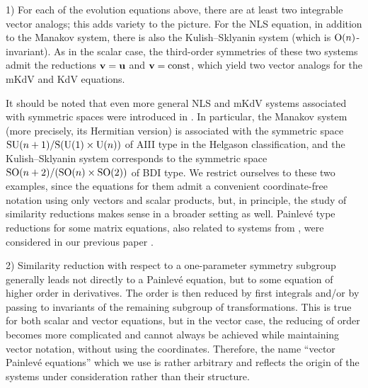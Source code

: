 \documentclass[11pt]{article}
\theoremstyle{plain}
\theoremstyle{definition}
\begin{document}
1) For each of the evolution equations above, there are at least two integrable vector analogs; this adds variety to the picture. For the NLS equation, in addition to the Manakov system, there is also the Kulish--Sklyanin system \cite{Kulish_Sklyanin_1981} (which is ${\rm O}(n)$-invariant). As in the scalar case, the third-order symmetries of these two systems admit the reductions ${\bf v}={\bf u}$ and ${\bf v}=\operatorname{const}$, which yield two vector analogs for the mKdV and KdV equations.

It should be noted that even more general NLS and mKdV systems associated with symmetric spaces were introduced in \cite{Fordy_Kulish_1983, Athorne_Fordy_1987}. In particular, the Manakov system (more precisely, its Hermitian version) is associated with the symmetric space ${\rm SU}(n+1)/{\rm S}({\rm U}(1)\times{\rm U}(n))$ of AIII type in the Helgason classification, and the Kulish--Sklyanin system corresponds to the symmetric space ${\rm SO}(n+2)/({\rm SO}(n)\times{\rm SO}(2))$ of BDI type. We restrict ourselves to these two examples, since the equations for them admit a convenient coordinate-free notation using only vectors and scalar products, but, in principle, the study of similarity reductions makes sense in a broader setting as well. Painlev\'e type reductions for some matrix equations, also related to systems from \cite{Fordy_Kulish_1983, Athorne_Fordy_1987}, were considered in our previous paper \cite{Adler_Sokolov_2021}.

2) Similarity reduction with respect to a one-parameter symmetry subgroup generally leads not directly to a Painlev\'e equation, but to some equation of higher order in derivatives. The order is then reduced by first integrals and/or by passing to invariants of the remaining subgroup of transformations. This is true for both scalar and vector equations, but in the vector case, the reducing of order becomes more complicated and cannot always be achieved while maintaining vector notation, without using the coordinates. Therefore, the name ``vector Painlev\'e equations'' which we use is rather arbitrary and reflects the origin of the systems under consideration rather than their structure.
\end{document}
